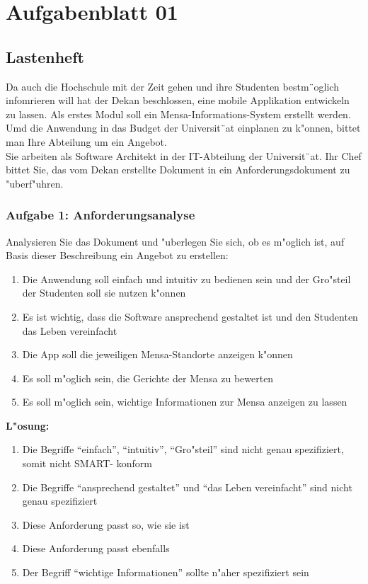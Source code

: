 

\chapter{Aufgabenblatt 01}
\section{Lastenheft}
Da auch die Hochschule mit der Zeit gehen und ihre Studenten bestm¨oglich infomrieren will hat der Dekan beschlossen, eine mobile Applikation entwickeln zu lassen.
Als erstes Modul soll ein Mensa-Informations-System erstellt werden.
Umd die Anwendung in das Budget der Universit¨at einplanen zu k"onnen, bittet man Ihre Abteilung um ein Angebot.\\

\noindent
Sie arbeiten als Software Architekt in der IT-Abteilung der Universit¨at.
Ihr Chef bittet Sie, das vom Dekan erstellte Dokument in ein Anforderungsdokument zu "uberf"uhren.

\subsection{Aufgabe 1: Anforderungsanalyse}
Analysieren Sie das Dokument und "uberlegen Sie sich, ob es m"oglich ist, auf Basis dieser Beschreibung ein Angebot zu erstellen:
\begin{enumerate}
    \item Die Anwendung soll einfach und intuitiv zu bedienen sein und der Gro"steil der Studenten soll sie nutzen k"onnen
    \item Es ist wichtig, dass die Software ansprechend gestaltet ist und den Studenten das Leben vereinfacht
    \item Die App soll die jeweiligen Mensa-Standorte anzeigen k"onnen
    \item Es soll m"oglich sein, die Gerichte der Mensa zu bewerten
    \item Es soll m"oglich sein, wichtige Informationen zur Mensa anzeigen zu lassen
\end{enumerate}

\textbf{L"osung:}
\begin {enumerate}
    \item Die Begriffe "`einfach"', "`intuitiv"', "`Gro"steil"' sind nicht genau spezifiziert, somit nicht SMART- konform
    \item Die Begriffe "`ansprechend gestaltet"' und "`das Leben vereinfacht"' sind nicht genau spezifiziert
    \item Diese Anforderung passt so, wie sie ist
    \item Diese Anforderung passt ebenfalls
    \item Der Begriff "`wichtige Informationen"' sollte n"aher spezifiziert sein
\end{enumerate}
    
